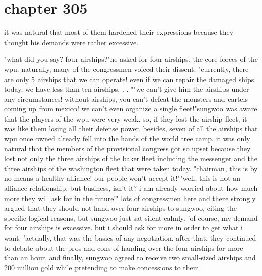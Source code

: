 \section{chapter 305}

it was natural that most of them hardened their expressions because they thought his demands were rather excessive.





"what did you say? four airships?"he asked for four airships, the core forces of the wpu.
naturally, many of the congressmen voiced their dissent.
"currently, there are only 5 airships that we can operate! even if we can repair the damaged ships today, we have less than ten airships.
.
.
""we can't give him the airships under any circumstances! without airships, you can't defeat the monsters and cartels coming up from mexico! we can't even organize a single fleet!"sungwoo was aware that the players of the wpu were very weak.
 so, if they lost the airship fleet, it was like them losing all their defense power.
 besides, seven of all the airships that wpu once owned already fell into the hands of the world tree camp.
it was only natural that the members of the provisional congress got so upset because they lost not only the three airships of the baker fleet including the messenger and the three airships of the washington fleet that were taken today.
"chairman, this is by no means a healthy alliance! our people won't accept it!""well, this is not an alliance relationship, but business, isn't it? i am already worried about how much more they will ask for in the future!" lots of congressmen here and there strongly argued that they should not hand over four airships to sungwoo, citing the specific logical reasons, but sungwoo just sat silent calmly.
'of course, my demand for four airships is excessive.
 but i should ask for more in order to get what i want.
'actually, that was the basics of any negotiation.
after that, they continued to debate about the pros and cons of handing over the four airships for more than an hour, and finally, sungwoo agreed to receive two small-sized airships and 200 million gold while pretending to make concessions to them.


